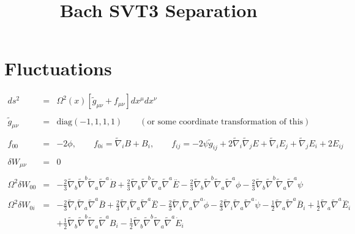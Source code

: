 \documentclass[10pt,letterpaper]{article}
\title{Bach SVT3 Separation}
\date{}
\numberwithin{equation}{section}
\begin{document}
 
\maketitle
\noindent 

\section{Fluctuations}
%
%
\begin{eqnarray}
ds^2 &=& \Omega^2(x)[\tilde g_{\mu\nu}+ f_{\mu\nu}] dx^\mu dx^\nu
\\ \nonumber\\
\tilde g_{\mu\nu} &=& \text{diag}\left(-1,1,1,1\right)\qquad (\text{or some coordinate transformation of this})
\\ \nonumber\\
f_{00} &=& -2\phi,\qquad f_{0i} = \tilde\nabla_i B + B_i,\qquad f_{ij} = -2\psi \tilde g_{ij} + 2\tilde\nabla_i\tilde\nabla_j E + 
\tilde\nabla_i E_j +\tilde\nabla_j E_i + 2E_{ij}
\label{svt}
\\ \nonumber\\
\delta W_{\mu\nu} &=&0
\\ \nonumber\\
\Omega^2\delta W_{00}&=& - \tfrac{2}{3} \tilde{\nabla}_{b}\tilde{\nabla}^{b}\tilde{\nabla}_{a}\tilde{\nabla}^{a}\dot{B} + \tfrac{2}{3} \tilde{\nabla}_{b}\tilde{\nabla}^{b}\tilde{\nabla}_{a}\tilde{\nabla}^{a}\overset{..}{E} -  \tfrac{2}{3} \tilde{\nabla}_{b}\tilde{\nabla}^{b}\tilde{\nabla}_{a}\tilde{\nabla}^{a}\phi -  \tfrac{2}{3} \tilde{\nabla}_{b}\tilde{\nabla}^{b}\tilde{\nabla}_{a}\tilde{\nabla}^{a}\psi 
\\  \nonumber\\ 
\Omega^2\delta W_{0i}&=& - \tfrac{2}{3} \tilde{\nabla}_{i}\tilde{\nabla}_{a}\tilde{\nabla}^{a}\overset{..}{B} + \tfrac{2}{3} \tilde{\nabla}_{i}\tilde{\nabla}_{a}\tilde{\nabla}^{a}\overset{...}{E} -  \tfrac{2}{3} \tilde{\nabla}_{i}\tilde{\nabla}_{a}\tilde{\nabla}^{a}\dot{\phi} -  \tfrac{2}{3} \tilde{\nabla}_{i}\tilde{\nabla}_{a}\tilde{\nabla}^{a}\dot{\psi}- \tfrac{1}{2} \tilde{\nabla}_{a}\tilde{\nabla}^{a}\overset{..}{B}_{i} + \tfrac{1}{2} \tilde{\nabla}_{a}\tilde{\nabla}^{a}\overset{...}{E}_{i} \nonumber \\ 
&& + \tfrac{1}{2} \tilde{\nabla}_{b}\tilde{\nabla}^{b}\tilde{\nabla}_{a}\tilde{\nabla}^{a}B_{i} -  \tfrac{1}{2} \tilde{\nabla}_{b}\tilde{\nabla}^{b}\tilde{\nabla}_{a}\tilde{\nabla}^{a}\dot{E}_{i}
\\  \nonumber\\ 

\end{eqnarray}
\end{document}
